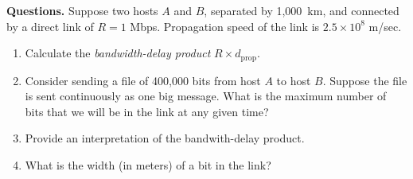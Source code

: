 \textbf{Questions.} \label{bandwidth_delay} Suppose two hosts \(A\)
and \(B\), separated by 1,000~km, and connected by a direct link of
\(R = 1\) Mbps. Propagation speed of the link is \(2.5 \times 10^8\)
m/sec.
\begin{enumerate}

  \item Calculate the \emph{bandwidth-delay product} \(R \times
    d_{\text{prop}}\).

  \item Consider sending a file of 400,000 bits from host \(A\) to
    host \(B\). Suppose the file is sent continuously as one big
    message. What is the maximum number of bits that we will be in the
    link at any given time?

  \item Provide an interpretation of the bandwith-delay product.

  \item What is the width (in meters) of a bit in the link?

\end{enumerate}
